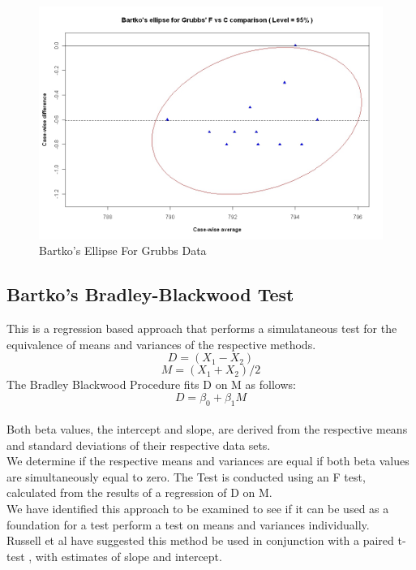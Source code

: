 \documentclass[12pt, a4paper]{article}
\begin{document}
\begin{figure}[h!]
	\includegraphics[width=130mm]{GrubbsBartko.jpeg}
	\caption{Bartko's Ellipse For Grubbs Data}\label{GrubbsBartko}
\end{figure}


\subsection{Bartko's Bradley-Blackwood Test}
This is a regression based approach that performs a simulataneous
test for the equivalence of means and variances of the respective
methods.\\
\begin{equation}
	D = (X_{1}-X_{2})
\end{equation}
\begin{equation}
	M = (X_{1} + X_{2}) /2
\end{equation}
The Bradley Blackwood Procedure fits D on M as follows:\\
\begin{equation}
	D = \beta_{0} + \beta_{1}M
\end{equation}
\\Both beta values, the intercept and slope, are derived from the respective means and
standard deviations of their respective data sets.\\
We determine if the respective means and variances are equal if
both beta values are simultaneously equal to zero. The Test is
conducted using an F test, calculated from the results of a
regression of D on M.
\\We have identified this approach  to be examined to see if it can
be used as a foundation for a test perform a test on means and
variances individually.\\
Russell et al have suggested this method be used in conjunction
with a paired t-test , with estimates of slope and intercept.
\end{document}

